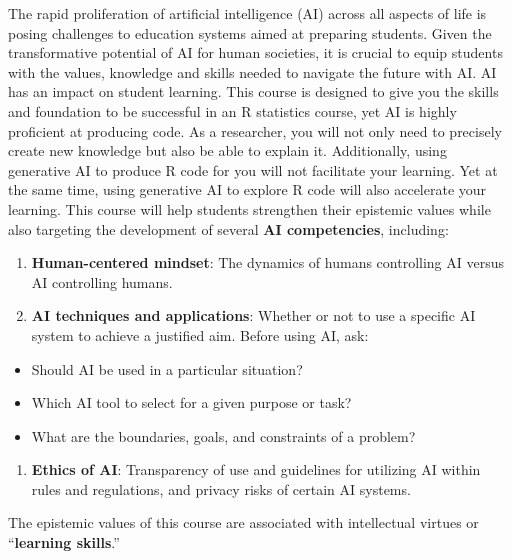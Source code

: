 \documentclass[
  12pt,
]{scrreprt}
\providecommand{\tightlist}{%
  \setlength{\itemsep}{0pt}\setlength{\parskip}{0pt}}
\begin{document}
The rapid proliferation of artificial intelligence (AI) across all
aspects of life is posing challenges to education systems aimed at
preparing students. Given the transformative potential of AI for human
societies, it is crucial to equip students with the values, knowledge
and skills needed to navigate the future with AI. AI has an impact on
student learning. This course is designed to give you the skills and
foundation to be successful in an R statistics course, yet AI is highly
proficient at producing code. As a researcher, you will not only need to
precisely create new knowledge but also be able to explain it.
Additionally, using generative AI to produce R code for you will not
facilitate your learning. Yet at the same time, using generative AI to
explore R code will also accelerate your learning. This course will help
students strengthen their epistemic values while also targeting the
development of several \textbf{AI competencies}, including:

\begin{enumerate}
\def\labelenumi{\arabic{enumi}.}
\item
  \textbf{Human-centered mindset}: The dynamics of humans controlling AI
  versus AI controlling humans.
\item
  \textbf{AI techniques and applications}: Whether or not to use a
  specific AI system to achieve a justified aim. Before using AI, ask:
\end{enumerate}

\begin{itemize}
\item
  Should AI be used in a particular situation?
\item
  Which AI tool to select for a given purpose or task?
\item
  What are the boundaries, goals, and constraints of a problem?
\end{itemize}

\begin{enumerate}
\def\labelenumi{\arabic{enumi}.}
\setcounter{enumi}{2}
\tightlist
\item
  \textbf{Ethics of AI}: Transparency of use and guidelines for
  utilizing AI within rules and regulations, and privacy risks of
  certain AI systems.
\end{enumerate}

\pagebreak

The epistemic values of this course are associated with intellectual
virtues or ``\textbf{learning skills}.''
\end{document}
